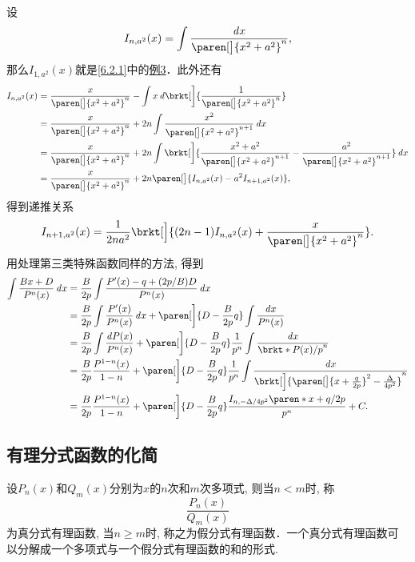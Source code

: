 \documentclass[a4paper,punct=CCT]{ctexbook}
\theoremstyle{definition}
\theoremstyle{remark}
\let\geq\geqslant
\let\ge\geq}
\begin{document}
\begin{enumerate}
  设
  \[
    I_{n,a^2}(x) = \int \frac{\dx}{\paren[\big]{x^2 + a^2}^n},
  \]
  那么\(I_{1,a^2}(x)\)就是\ref{6.2.1}中的\hyperlink{eg:arctan}{例3}．此外还有
  \begin{align*}
    I_{n,a^2}(x)
    &= \frac{x}{\paren[\big]{x^2 + a^2}^n} - \int x \diff\brkt[\bigg]{\frac{1}{\paren[\big]{x^2 + a^2}^n}} \\
    &= \frac{x}{\paren[\big]{x^2 + a^2}^n} + 2n \int \frac{x^2}{\paren[\big]{x^2 + a^2}^{n+1}} \dx \\
    &= \frac{x}{\paren[\big]{x^2 + a^2}^n} + 2n \int \brkt[\bigg]{\frac{x^2 + a^2}{\paren[\big]{x^2 + a^2}^{n+1}} - \frac{a^2}{\paren[\big]{x^2 + a^2}^{n+1}}} \dx \\
    &= \frac{x}{\paren[\big]{x^2 + a^2}^n} + 2n \paren[\big]{I_{n,a^2}(x) - a^2 I_{n+1,a^2}(x)},
  \end{align*}
  得到递推关系
  \begin{equation}
    I_{n+1,a^2}(x) = \frac{1}{2na^2} \brkt[\Big]{(2n-1) I_{n,a^2}(x) + \frac{x}{\paren[\big]{x^2 + a^2}^n}}.
  \end{equation}
  用处理第三类特殊函数同样的方法, 得到
  \begin{align*}
    \int \frac{Bx+D}{P^n(x)} \dx
    &= \frac{B}{2p} \int \frac{P'(x) - q + (2p/B)D}{P^n(x)} \dx \\
    &= \frac{B}{2p} \int \frac{P'(x)}{P^n(x)} \dx + \paren[\bigg]{D - \frac{B}{2p} q} \int \frac{\dx}{P^n(x)} \\
    &= \frac{B}{2p} \int \frac{\diff P(x)}{P^n(x)} + \paren[\bigg]{D - \frac{B}{2p} q} \frac1{p^n} \int \frac{\dx}{\brkt*{P(x)/p}^n} \\
    &= \frac{B}{2p} \frac{P^{1-n}(x)}{1-n} + \paren[\bigg]{D - \frac{B}{2p} q} \frac1{p^n} \int \frac{\dx}{\brkt[\Big]{\paren[\big]{x+\frac{q}{2p}}^2 - \frac{\Delta}{4p^2}}^n} \\
    &= \frac{B}{2p} \frac{P^{1-n}(x)}{1-n} + \paren[\bigg]{D - \frac{B}{2p} q} \frac{I_{n,-\Delta/4p^2}\paren*{x+q/2p}}{p^n} + C.
  \end{align*}
\end{enumerate}

\subsection{有理分式函数的化简}

设\(P_n(x)\)和\(Q_m(x)\)分别为\(x\)的\(n\)次和\(m\)次多项式, 则当\(n < m\)时, 称
\[
  \frac{P_n(x)}{Q_m(x)}
\]
为真分式有理函数, 当\(n \ge m\)时, 称之为假分式有理函数．一个真分式有理函数可以分解成一个多项式与一个假分式有理函数的和的形式.
\end{document}
